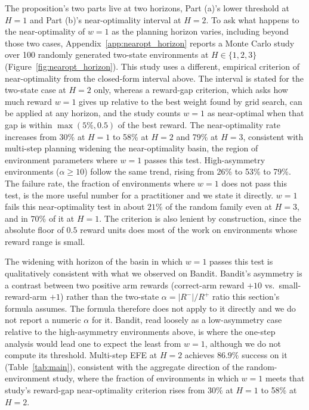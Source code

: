 The proposition's two parts live at two horizons, Part (a)'s lower threshold at $H{=}1$ and Part (b)'s near-optimality interval at $H{=}2$. To ask what happens to the near-optimality of $w{=}1$ as the planning horizon varies, including beyond those two cases, Appendix~\ref{app:nearopt_horizon} reports a Monte Carlo study over 100 randomly generated two-state environments at $H \in \{1, 2, 3\}$ (Figure~\ref{fig:nearopt_horizon}). This study uses a different, empirical criterion of near-optimality from the closed-form interval above. The interval is stated for the two-state case at $H{=}2$ only, whereas a reward-gap criterion, which asks how much reward $w{=}1$ gives up relative to the best weight found by grid search, can be applied at any horizon, and the study counts $w{=}1$ as near-optimal when that gap is within $\max(5\%, 0.5)$ of the best reward. The near-optimality rate increases from 30\% at $H{=}1$ to 58\% at $H{=}2$ and 79\% at $H{=}3$, consistent with multi-step planning widening the near-optimality basin, the region of environment parameters where $w{=}1$ passes this test. High-asymmetry environments ($\alpha \geq 10$) follow the same trend, rising from 26\% to 53\% to 79\%. The failure rate, the fraction of environments where $w{=}1$ does not pass this test, is the more useful number for a practitioner and we state it directly. $w{=}1$ fails this near-optimality test in about $21\%$ of the random family even at $H{=}3$, and in $70\%$ of it at $H{=}1$. The criterion is also lenient by construction, since the absolute floor of $0.5$ reward units does most of the work on environments whose reward range is small.

The widening with horizon of the basin in which $w{=}1$ passes this test is qualitatively consistent with what we observed on Bandit. Bandit's asymmetry is a contrast between two positive arm rewards (correct-arm reward $+10$ vs.\ small-reward-arm $+1$) rather than the two-state $\alpha{=}|R^-|/R^+$ ratio this section's formula assumes. The formula therefore does not apply to it directly and we do not report a numeric $\alpha$ for it. Bandit, read loosely as a low-asymmetry case relative to the high-asymmetry environments above, is where the one-step analysis would lead one to expect the least from $w{=}1$, although we do not compute its threshold. Multi-step EFE at $H{=}2$ achieves $86.9\%$ success on it (Table~\ref{tab:main}), consistent with the aggregate direction of the random-environment study, where the fraction of environments in which $w{=}1$ meets that study's reward-gap near-optimality criterion rises from 30\% at $H{=}1$ to 58\% at $H{=}2$.


